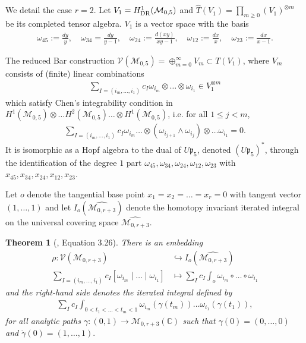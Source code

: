 \documentclass[a4paper,fleqn]{cas-sc}
\newtheorem{theorem}{Theorem}
\begin{document}
\begin{ex}
We detail the case $r=2$. Let $V_1=H^1_{\rm{DR}}(\mathcal{M}_{0,5})$ and $\widehat{T}(V_1)=\prod_{m\ge 0}(V_1)^{\otimes m}$ be its completed tensor algebra. $V_1$ is a vector space with the basis
\begin{align*}
\omega_{45}:=\frac{dy}{y},\quad \omega_{34}=\frac{dy}{y-1},\quad \omega_{24}:=\frac{d(xy)}{xy-1},\quad \omega_{12}:=\frac{dx}{x},\quad \omega_{23}:=\frac{dx}{x-1}.
\end{align*}

The reduced Bar construction
$\mathcal{V}(\mathcal{M}_{0,5})=\oplus^{\infty}_{m=0} V_m \subset T(V_1)$, where $V_m$ consists of (finite) linear combinations %
\begin{align*}
\sum_{I=(i_m,\ldots,i_1)}c_I\omega_{i_m}\otimes\ldots \otimes \omega_{i_1}\in V_1^{\otimes m}
\end{align*}
which satisfy Chen's integrability condition in $H^1(\mathcal{M}_{0,5})\otimes \ldots H^2(\mathcal{M}_{0,5})\ldots\otimes H^1(\mathcal{M}_{0,5})$, i.e. for all $1\le j<m$,
\begin{align*}
\sum_{I=(i_m,\ldots,i_1)} c_I\omega_{i_m}\ldots \otimes (\omega_{i_{j+1}}\wedge \omega_{i_j})\otimes\ldots \omega_{i_1}=0.
\end{align*}
It is isomorphic as a Hopf algebra to the dual of $U\mathfrak{p}_5$, denoted $(U\mathfrak{p}_5)^{*}$, through the identification of the degree $1$ part $\omega_{45},\omega_{34},\omega_{24},\omega_{12},\omega_{23}$ with $x_{45},x_{34}, x_{24},x_{12}, x_{23}$.
\end{ex}

Let $o$ denote the tangential base point $x_1=x_2=\ldots=x_r=0$ with tangent vector $(1,\ldots,1)$ and let $I_o(\widehat{\mathcal{M}_{0,r+3}})$ denote the homotopy invariant iterated integral on the universal covering space $\widehat{\mathcal{M}_{0,r+3}}$.

\begin{theorem}[\cite{Brown2009}, Equation 3.26]
There is an embedding 
    \begin{align*}
        \rho: \mathcal{V}(\mathcal{M}_{0,r+3}) & \hookrightarrow I_{o}(\widehat{\mathcal{M}_{0,r+3}}) \\
        \sum_{I=(i_m,\ldots,i_1)}c_I[\omega_{i_m} \mid \ldots \mid \omega_{i_1}] & \mapsto \sum_{I}c_I \int_{o}\omega_{i_m}\circ \ldots \circ \omega_{i_1} 
    \end{align*}
and the right-hand side denotes the iterated integral defined by
\begin{align*}
\sum_{I}c_I\int_{0<t_1<\ldots<t_m<1}\omega_{i_m}(\gamma(t_m))\ldots \omega_{i_1}(\gamma(t_1)),
\end{align*}
for all analytic paths $\gamma:(0,1)\to \mathcal{M}_{0,r+3}(\mathbb{C})$ such that $\gamma(0)=(0,\ldots,0)$ and $\dot{\gamma}(0)=(1,\ldots,1).$
\end{theorem}
\end{document}
